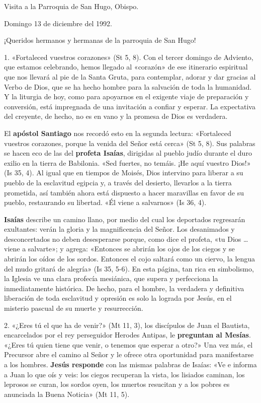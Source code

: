 \documentclass[]{article}
\begin{document}
Visita a la Parroquia de San Hugo, Obispo. 

Domingo 13 de diciembre del 1992.

¡Queridos hermanos y hermanas de la parroquia de San Hugo!

1. «Fortaleced vuestros corazones» (St 5, 8). Con el tercer domingo de
Adviento, que estamos celebrando, hemos llegado al «corazón» de ese
itinerario espiritual que nos llevará al pie de la Santa Gruta, para
contemplar, adorar y dar gracias al Verbo de Dios, que se ha hecho
hombre para la salvación de toda la humanidad. Y la liturgia de hoy,
como para apoyarnos en el exigente viaje de preparación y conversión,
está impregnada de una invitación a confiar y esperar. La expectativa
del creyente, de hecho, no es en vano y la promesa de Dios es verdadera.

El \textbf{apóstol Santiago} nos recordó esto en la segunda lectura:
«Fortaleced vuestros corazones, porque la venida del Señor está cerca»
(St 5, 8). Sus palabras se hacen eco de las del \textbf{profeta Isaías},
dirigidas al pueblo judío durante el duro exilio en la tierra de
Babilonia. «Sed fuertes, no temáis. ¡He aquí vuestro Dios!» (Is 35, 4).
Al igual que en tiempos de Moisés, Dios intervino para liberar a su
pueblo de la esclavitud egipcia y, a través del desierto, llevarlos a la
tierra prometida, así también ahora está dispuesto a hacer maravillas en
favor de su pueblo, restaurando su libertad. «Él viene a salvarnos» (Is
36, 4).

\textbf{Isaías} describe un camino llano, por medio del cual los
deportados regresarán exultantes: verán la gloria y la magnificencia del
Señor. Los desanimados y desconcertados no deben desesperarse porque,
como dice el profeta, «tu Dios \ldots{} viene a salvarte»; y agrega:
«Entonces se abrirán los ojos de los ciegos y se abrirán los oídos de
los sordos. Entonces el cojo saltará como un ciervo, la lengua del mudo
gritará de alegría» (Is 35, 5-6). En esta página, tan rica en
simbolismo, la Iglesia ve una clara profecía mesiánica, que supera y
perfecciona la inmediatamente histórica. De hecho, para el hombre, la
verdadera y definitiva liberación de toda esclavitud y opresión es solo
la lograda por Jesús, en el misterio pascual de su muerte y
resurrección.

2. «¿Eres tú el que ha de venir?» (Mt 11, 3), los discípulos de Juan el
Bautista, encarcelados por el rey perseguidor Herodes Antipas, le
\textbf{preguntan al Mesías}. «¿Eres tú quien tiene que venir, o tenemos
que esperar a otro?» Una vez más, el Precursor abre el camino al Señor y
le ofrece otra oportunidad para manifestarse a los hombres.
\textbf{Jesús responde} con las mismas palabras de Isaías: «Ve e informa
a Juan lo que oís y veis: los ciegos recuperan la vista, los lisiados
caminan, los leprosos se curan, los sordos oyen, los muertos resucitan y
a los pobres es anunciada la Buena Noticia» (Mt 11, 5).
\end{document}
